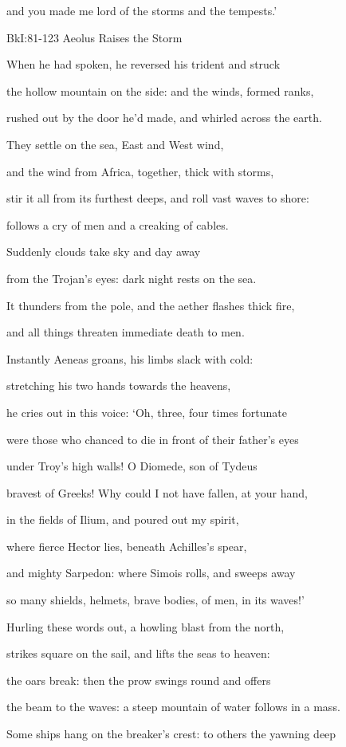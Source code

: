 \documentclass[12pt, a5paper]{minimal}
\begin{document}
and you made me lord of the storms and the tempests.’

BkI:81-123 Aeolus Raises the Storm

When he had spoken, he reversed his trident and struck

the hollow mountain on the side: and the winds, formed ranks,

rushed out by the door he’d made, and whirled across the earth.

They settle on the sea, East and West wind,

and the wind from Africa, together, thick with storms,

stir it all from its furthest deeps, and roll vast waves to shore:

follows a cry of men and a creaking of cables.

Suddenly clouds take sky and day away

from the Trojan’s eyes: dark night rests on the sea.

It thunders from the pole, and the aether flashes thick fire,

and all things threaten immediate death to men.

Instantly Aeneas groans, his limbs slack with cold:

stretching his two hands towards the heavens,

he cries out in this voice: ‘Oh, three, four times fortunate

were those who chanced to die in front of their father’s eyes

under Troy’s high walls! O Diomede, son of Tydeus

bravest of Greeks! Why could I not have fallen, at your hand,

in the fields of Ilium, and poured out my spirit,

where fierce Hector lies, beneath Achilles’s spear,

and mighty Sarpedon: where Simois rolls, and sweeps away

so many shields, helmets, brave bodies, of men, in its waves!’

Hurling these words out, a howling blast from the north,

strikes square on the sail, and lifts the seas to heaven:

the oars break: then the prow swings round and offers

the beam to the waves: a steep mountain of water follows in a mass.

Some ships hang on the breaker’s crest: to others the yawning deep
\end{document}
